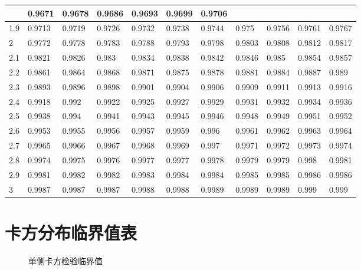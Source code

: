 \documentclass[letterpaper,10pt,english]{sphinxmanual}
\begin{document}
\begin{savenotes}
\begin{longtable}[c]{|l|l|l|l|l|l|l|l|l|l|l|}
&
0.9671
&
0.9678
&
0.9686
&
0.9693
&
0.9699
&
0.9706
\\
\hline
1.9
&
0.9713
&
0.9719
&
0.9726
&
0.9732
&
0.9738
&
0.9744
&
0.975
&
0.9756
&
0.9761
&
0.9767
\\
\hline
2
&
0.9772
&
0.9778
&
0.9783
&
0.9788
&
0.9793
&
0.9798
&
0.9803
&
0.9808
&
0.9812
&
0.9817
\\
\hline
2.1
&
0.9821
&
0.9826
&
0.983
&
0.9834
&
0.9838
&
0.9842
&
0.9846
&
0.985
&
0.9854
&
0.9857
\\
\hline
2.2
&
0.9861
&
0.9864
&
0.9868
&
0.9871
&
0.9875
&
0.9878
&
0.9881
&
0.9884
&
0.9887
&
0.989
\\
\hline
2.3
&
0.9893
&
0.9896
&
0.9898
&
0.9901
&
0.9904
&
0.9906
&
0.9909
&
0.9911
&
0.9913
&
0.9916
\\
\hline
2.4
&
0.9918
&
0.992
&
0.9922
&
0.9925
&
0.9927
&
0.9929
&
0.9931
&
0.9932
&
0.9934
&
0.9936
\\
\hline
2.5
&
0.9938
&
0.994
&
0.9941
&
0.9943
&
0.9945
&
0.9946
&
0.9948
&
0.9949
&
0.9951
&
0.9952
\\
\hline
2.6
&
0.9953
&
0.9955
&
0.9956
&
0.9957
&
0.9959
&
0.996
&
0.9961
&
0.9962
&
0.9963
&
0.9964
\\
\hline
2.7
&
0.9965
&
0.9966
&
0.9967
&
0.9968
&
0.9969
&
0.997
&
0.9971
&
0.9972
&
0.9973
&
0.9974
\\
\hline
2.8
&
0.9974
&
0.9975
&
0.9976
&
0.9977
&
0.9977
&
0.9978
&
0.9979
&
0.9979
&
0.998
&
0.9981
\\
\hline
2.9
&
0.9981
&
0.9982
&
0.9982
&
0.9983
&
0.9984
&
0.9984
&
0.9985
&
0.9985
&
0.9986
&
0.9986
\\
\hline
3
&
0.9987
&
0.9987
&
0.9987
&
0.9988
&
0.9988
&
0.9989
&
0.9989
&
0.9989
&
0.999
&
0.999
\\
\hline
\end{longtable}\sphinxatlongtableend\end{savenotes}


\section{卡方分布临界值表}
\label{\detokenize{_u9644_u5f55/_u5206_u5e03_u8868:id3}}
\begin{figure}[htbp]
\centering
\capstart

\noindent{}
\caption{单侧卡方检验临界值}\label{\detokenize{_u9644_u5f55/_u5206_u5e03_u8868:id5}}\label{\detokenize{_u9644_u5f55/_u5206_u5e03_u8868:pic-003}}\end{figure}
\end{document}
